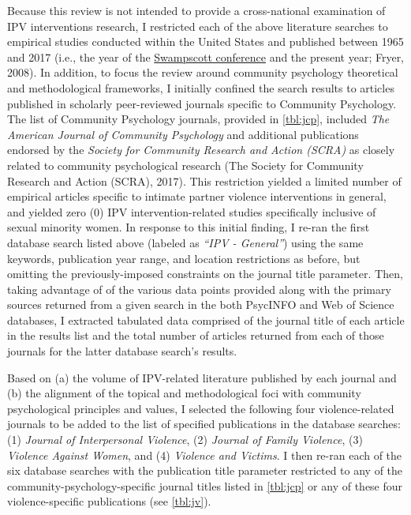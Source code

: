 \documentclass[11pt,]{tufte-book}
\begin{document}
Because this review is not intended to provide a cross-national
examination of IPV interventions research, I restricted each of the
above literature searches to empirical studies conducted within the
United States and published between 1965 and 2017 (i.e., the year of the
\href{http://www.scra27.org/publications/tcp/tcp-past-issues/tcpsummer2014/remembering-swampscott/}{Swampscott
conference} and the present year; Fryer, 2008). In addition, to focus
the review around community psychology theoretical and methodological
frameworks, I initially confined the search results to articles
published in scholarly peer-reviewed journals specific to Community
Psychology. The list of Community Psychology journals, provided in
\cref{tbl:jcp}, included \emph{The American Journal of
Community Psychology} and additional publications endorsed by the
\emph{Society for Community Research and Action (SCRA)} as closely
related to community psychological research (The Society for Community
Research and Action (SCRA), 2017). This restriction yielded a limited
number of empirical articles specific to intimate partner violence
interventions in general, and yielded zero (0) IPV intervention-related
studies specifically inclusive of sexual minority women. In response to
this initial finding, I re-ran the first database search listed above
(labeled as \emph{``IPV - General''}) using the same keywords,
publication year range, and location restrictions as before, but
omitting the previously-imposed constraints on the journal title
parameter. Then, taking advantage of of the various data points provided
along with the primary sources returned from a given search in the both
PsycINFO and Web of Science databases, I extracted tabulated data
comprised of the journal title of each article in the results list and
the total number of articles returned from each of those journals for
the latter database search's results.

Based on (a) the volume of IPV-related literature published by each
journal and (b) the alignment of the topical and methodological foci
with community psychological principles and values, I selected the
following four violence-related journals to be added to the list of
specified publications in the database searches: (1) \emph{Journal of
Interpersonal Violence}, (2) \emph{Journal of Family Violence}, (3)
\emph{Violence Against Women}, and (4) \emph{Violence and Victims}. I
then re-ran each of the six database searches with the publication title
parameter restricted to any of the community-psychology-specific journal
titles listed in \cref{tbl:jcp} or any of these four
violence-specific publications (see \cref{tbl:jv}).
\end{document}
